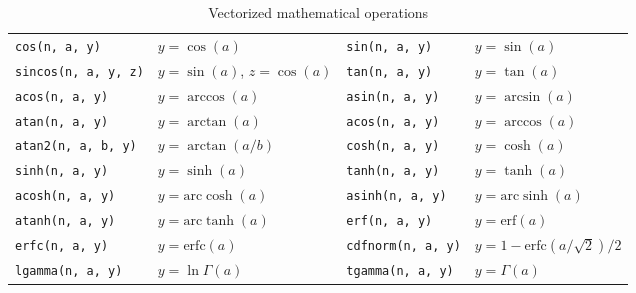 \begin{table}[ht]
\begin{tabu}{X[l]X[l]X[l]X[l]}
    \texttt{cos(n, a, y)}       & $y = \cos(a)$                             &
    \texttt{sin(n, a, y)}       & $y = \sin(a)$                             \\
    \texttt{sincos(n, a, y, z)} & $y = \sin(a)$, $z = \cos(a)$              &
    \texttt{tan(n, a, y)}       & $y = \tan(a)$                             \\
    \texttt{acos(n, a, y)}      & $y = \arccos(a)$                          &
    \texttt{asin(n, a, y)}      & $y = \arcsin(a)$                          \\
    \texttt{atan(n, a, y)}      & $y = \arctan(a)$                          &
    \texttt{acos(n, a, y)}      & $y = \arccos(a)$                          \\
    \texttt{atan2(n, a, b, y)}  & $y = \arctan(a / b)$                      &
    \texttt{cosh(n, a, y)}      & $y = \cosh(a)$                            \\
    \texttt{sinh(n, a, y)}      & $y = \sinh(a)$                            &
    \texttt{tanh(n, a, y)}      & $y = \tanh(a)$                            \\
    \texttt{acosh(n, a, y)}     & $y = \mathrm{arc}\cosh(a)$                &
    \texttt{asinh(n, a, y)}     & $y = \mathrm{arc}\sinh(a)$                \\
    \texttt{atanh(n, a, y)}     & $y = \mathrm{arc}\tanh(a)$                &
    \texttt{erf(n, a, y)}       & $y = \mathrm{erf}(a)$                     \\
    \texttt{erfc(n, a, y)}      & $y = \mathrm{erfc}(a)$                    &
    \texttt{cdfnorm(n, a, y)}   & $y = 1 - \mathrm{erfc}(a / \sqrt{2}) / 2$ \\
    \texttt{lgamma(n, a, y)}    & $y = \ln\Gamma(a)$                        &
    \texttt{tgamma(n, a, y)}    & $y = \Gamma(a)$                           \\
    \bottomrule
  \end{tabu}
  \caption{Vectorized mathematical operations}
  \label{tab:Vectorized mathematical operations}
\end{table}

